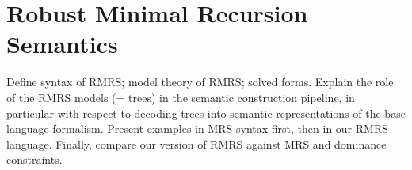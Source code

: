 \section{Robust Minimal Recursion Semantics}
\label{sec:rmrs}

Define syntax of RMRS; model theory of RMRS; solved forms.  Explain
the role of the RMRS models (= trees) in the semantic construction
pipeline, in particular with respect to decoding trees into semantic
representations of the base language formalism.  Present examples in
MRS syntax first, then in our RMRS language.  Finally, compare our
version of RMRS against MRS and dominance constraints.


